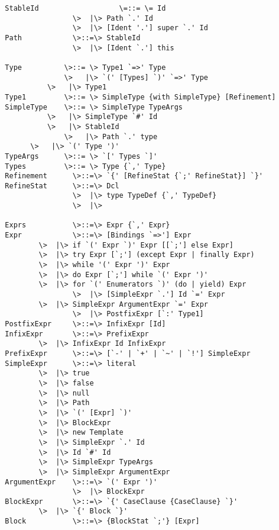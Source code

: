 \documentclass[11pt]{report}
\begin{document}
\begin{verbatim}
  StableId                   \=::= \= Id
                  \>  |\> Path `.' Id
                  \>  |\> [Ident '.'] super `.' Id
  Path            \>::=\> StableId
                  \>  |\> [Ident `.'] this

  Type          \>::= \> Type1 `=>' Type
                \>   |\> `(' [Types] `)' `=>' Type
	        \>   |\> Type1
  Type1         \>::= \> SimpleType {with SimpleType} [Refinement]
  SimpleType   	\>::= \> SimpleType TypeArgs
	        \>   |\> SimpleType `#' Id
	        \>   |\> StableId
                \>   |\> Path `.' type
		\>   |\> `(' Type ')'
  TypeArgs     	\>::= \> `[' Types `]'
  Types         \>::= \> Type {`,' Type}
  Refinement      \>::=\> `{' [RefineStat {`;' RefineStat}] `}'
  RefineStat      \>::=\> Dcl
                  \>  |\> type TypeDef {`,' TypeDef}
                  \>  |\>

  Exprs           \>::=\> Expr {`,' Expr}
  Expr            \>::=\> [Bindings `=>'] Expr
		  \>  |\> if `(' Expr `)' Expr [[`;'] else Expr]
		  \>  |\> try Expr [`;'] (except Expr | finally Expr)
		  \>  |\> while '(' Expr ')' Expr
		  \>  |\> do Expr [`;'] while `(' Expr ')'
		  \>  |\> for `(' Enumerators `)' (do | yield) Expr
                  \>  |\> [SimpleExpr `.'] Id `=' Expr
		  \>  |\> SimpleExpr ArgumentExpr `=' Expr
                  \>  |\> PostfixExpr [`:' Type1]
  PostfixExpr     \>::=\> InfixExpr [Id]
  InfixExpr       \>::=\> PrefixExpr
		  \>  |\> InfixExpr Id InfixExpr
  PrefixExpr      \>::=\> [`-' | `+' | `~' | `!'] SimpleExpr 
  SimpleExpr      \>::=\> literal
		  \>  |\> true
		  \>  |\> false
		  \>  |\> null
		  \>  |\> Path
		  \>  |\> `(' [Expr] `)'
		  \>  |\> BlockExpr
		  \>  |\> new Template 
		  \>  |\> SimpleExpr `.' Id 
		  \>  |\> Id `#' Id 
		  \>  |\> SimpleExpr TypeArgs
		  \>  |\> SimpleExpr ArgumentExpr
  ArgumentExpr    \>::=\> `(' Expr ')'
                  \>  |\> BlockExpr
  BlockExpr       \>::=\> `{' CaseClause {CaseClause} `}'
		  \>  |\> `{' Block `}'
  Block           \>::=\> {BlockStat `;'} [Expr]
\end{verbatim}
\end{document}
